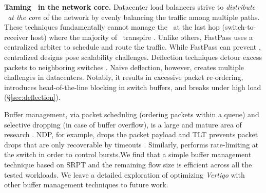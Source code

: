 \textbf{Taming \bursts \ in the network core.}
Datacenter load balancers \cite{conga, presto, drill, letflow} strive to \emph{distribute \bursts\ at the core} of the network by evenly balancing the traffic among multiple paths. These techniques fundamentally cannot manage the \bursts \ at the last hop (switch-to-receiver host) where the majority of \bursts \ transpire \cite{jupiter, high-resolution, hpcc}. Unlike others, FastPass \cite{fastpass} uses a centralized arbiter to schedule and route the traffic. While FastPass can prevent \bursts, centralized designs pose scalability challenges. 
%
%
Deflection techniques detour excess packets to neighboring switches \cite{dibs, pabo}. Naive deflection, however, creates multiple challenges in datacenters. Notably, it results in excessive packet re-ordering, introduces head-of-the-line blocking in switch buffers, and breaks under high load (\S\ref{sec:deflection}).

Buffer management, \eg via packet scheduling (ordering packets within a queue) and selective dropping (in case of buffer overflow), is a large and mature area of research \cite{pdq, pfabric, tlt, NDP, shreedhar1995efficient, blake1998architecture, parekh1993generalized, demers1989analysis, clark1992supporting}. NDP, for example, drops the packet payload \cite{NDP} and TLT prevents packet drops that are only recoverable by timeouts
\cite{tlt}. Similarly, \cite{floodgate} performs rate-limiting at the switch in order to control bursts.We find that a simple buffer management technique based on SRPT and the remaining flow size is efficient across all the tested workloads. We leave a detailed exploration of optimizing \textit{Vertigo} with other buffer management techniques to future work.

